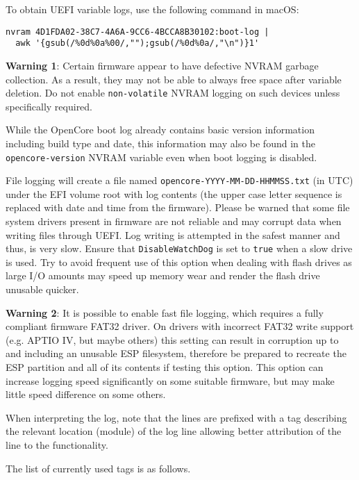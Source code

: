 \documentclass[]{article}
\begin{document}
\begin{enumerate}
  To obtain UEFI variable logs, use the following command in macOS:
\begin{lstlisting}[label=nvramlog, style=ocbash]
nvram 4D1FDA02-38C7-4A6A-9CC6-4BCCA8B30102:boot-log |
  awk '{gsub(/%0d%0a%00/,"");gsub(/%0d%0a/,"\n")}1'
\end{lstlisting}

  \textbf{Warning 1}: Certain firmware appear to have defective NVRAM garbage collection.
  As a result, they may not be able to always free space after variable deletion. Do not
  enable \texttt{non-volatile} NVRAM logging on such devices unless specifically required.

  While the OpenCore boot log already contains basic version information including build type
  and date, this information may also be found in the \texttt{opencore-version} NVRAM variable
  even when boot logging is disabled.

  File logging will create a file named \texttt{opencore-YYYY-MM-DD-HHMMSS.txt} (in UTC) under
  the EFI volume root with log contents (the upper case letter sequence is replaced with date
  and time from the firmware). Please be warned that some file system drivers present in
  firmware are not reliable and may corrupt data when writing files through UEFI. Log
  writing is attempted in the safest manner and thus, is very slow. Ensure that
  \texttt{DisableWatchDog} is set to \texttt{true} when a slow drive is used. Try to
  avoid frequent use of this option when dealing with flash drives as large I/O
  amounts may speed up memory wear and render the flash drive unusable quicker.

  \textbf{Warning 2}: It is possible to enable fast file logging, which requires a fully compliant
  firmware FAT32 driver. On drivers with incorrect FAT32 write support (e.g. APTIO IV, but maybe
  others) this setting can result in corruption up to and including an unusable ESP filesystem,
  therefore be prepared to recreate the ESP partition and all of its contents if testing this option.
  This option can increase logging speed significantly on some suitable firmware, but may make little
  speed difference on some others.

  When interpreting the log, note that the lines are prefixed with a tag describing
  the relevant location (module) of the log line allowing better attribution of the
  line to the functionality.

  The list of currently used tags is as follows.


\end{enumerate}
\end{document}
